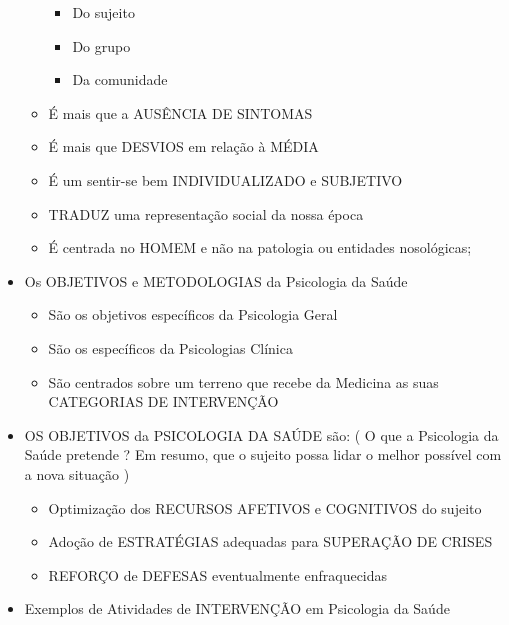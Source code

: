 \documentclass[
]{book}
\providecommand{\tightlist}{%
  \setlength{\itemsep}{0pt}\setlength{\parskip}{0pt}}
\begin{document}
\begin{itemize}
\begin{itemize}
    \begin{itemize}
    \tightlist
    \item
      Do sujeito
    \item
      Do grupo
    \item
      Da comunidade
    \end{itemize}
  \item
    É mais que a AUSÊNCIA DE SINTOMAS
  \item
    É mais que DESVIOS em relação à MÉDIA
  \item
    É um sentir-se bem INDIVIDUALIZADO e SUBJETIVO
  \item
    TRADUZ uma representação social da nossa época
  \item
    É centrada no HOMEM e não na patologia ou entidades nosológicas;
  \end{itemize}
\item
  Os OBJETIVOS e METODOLOGIAS da Psicologia da Saúde

  \begin{itemize}
  \tightlist
  \item
    São os objetivos específicos da Psicologia Geral
  \item
    São os específicos da Psicologias Clínica
  \item
    São centrados sobre um terreno que recebe da Medicina as suas CATEGORIAS DE INTERVENÇÃO
  \end{itemize}
\item
  OS OBJETIVOS da PSICOLOGIA DA SAÚDE são: ( O que a Psicologia da Saúde pretende ? Em resumo, que o sujeito possa lidar o melhor possível com a nova situação )

  \begin{itemize}
  \tightlist
  \item
    Optimização dos RECURSOS AFETIVOS e COGNITIVOS do sujeito
  \item
    Adoção de ESTRATÉGIAS adequadas para SUPERAÇÃO DE CRISES
  \item
    REFORÇO de DEFESAS eventualmente enfraquecidas
  \end{itemize}
\item
  Exemplos de Atividades de INTERVENÇÃO em Psicologia da Saúde


\end{itemize}
\end{document}
